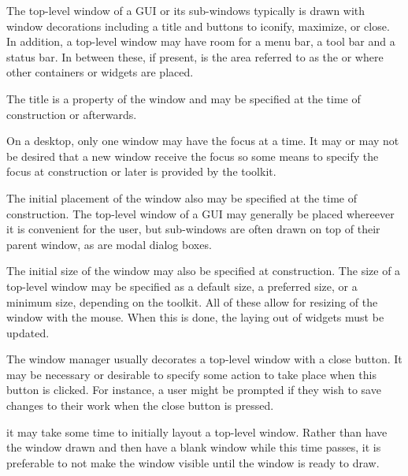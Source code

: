The top-level window of a GUI or its sub-windows typically is drawn
with window decorations including a title and buttons to iconify,
maximize, or close. In addition, a top-level window may have room for
a menu bar, a tool bar and a status bar. In between these, if present,
is the area referred to as the  or  where other containers or widgets are placed.




The title is a property of the window and may be specified at the time
of construction or afterwards. 

On a desktop, only one window may have the focus at a time. It may or
may not be desired that a new window receive the focus so some means
to specify the focus at construction or later is provided by the
toolkit.

The initial placement of the window also may be specified at the time
of construction. The top-level window of a GUI may generally be placed
whereever it is convenient for the user, but sub-windows are often
drawn on top of their parent window, as are modal dialog boxes. 

The initial size of the window may also be specified at
construction. The size of a top-level window may be specified as a
default size, a preferred size, or a minimum size, depending on the
toolkit. All of these allow for resizing of the window with the
mouse. When this is done, the laying out of widgets must be updated.


The window manager usually decorates a top-level window with a close
button. It may be necessary or desirable to specify some action to
take place when this button is clicked. For instance, a user might be
prompted if they wish to save changes to their work when the close
button is pressed.

it may take some time to initially layout a top-level window. Rather
than have the window drawn and then have a blank window while this
time passes, it is preferable to not make the window visible until the
window is ready to draw. 

